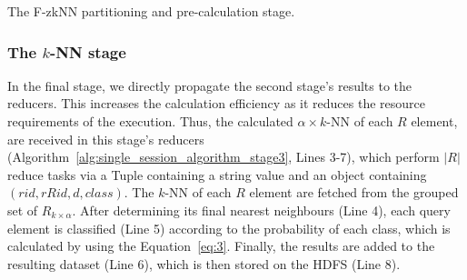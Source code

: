 \vspace{-2mm}
\begin{algorithm}[htbp]
	\scriptsize
	\DontPrintSemicolon
	\BlankLine
	\caption{The F-zkNN partitioning and pre-calculation stage.}
	\label{alg:single_session_algorithm_stage2}	
\end{algorithm}
\vspace{-4mm}
	
\subsubsection{The $k$-NN stage}
\label{subsec:fzknn3_3}
In the final stage, we directly propagate the second stage's results to the reducers. This increases the calculation efficiency as it reduces the resource requirements of the execution. Thus, the calculated $\alpha \times k$-NN of each $R$ element, are received in this stage's reducers (Algorithm~\ref{alg:single_session_algorithm_stage3}, Lines 3-7), which perform $|R|$ reduce tasks via a Tuple containing a string value and an object containing $(rid, rRid, d, class)$. The $k$-NN of each $R$ element are fetched from the grouped set of $R_{k \times \alpha}$. After determining its final nearest neighbours (Line 4), each query element is classified (Line 5) according to the probability of each class, which is calculated by using the Equation~\ref{eq:3}. Finally, the results are added to the resulting dataset (Line 6), which is then stored on the HDFS (Line 8).
 
